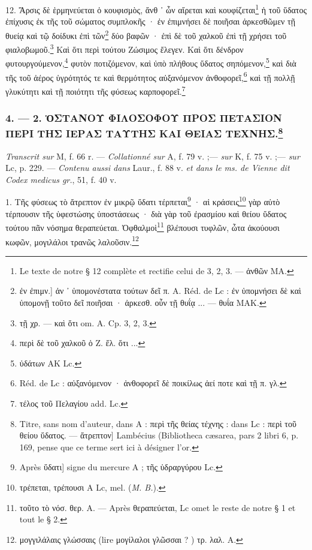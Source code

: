 \documentclass[a4paper, 11pt, oneside, polutonikogreek, french]{article}
\begin{document}
12. Ἄρσις δὲ ἑρμηνεύεται ὁ κουφισμὸς, ἄνθ ᾽ ὧν αἴρεται καὶ κουφίζεται\footnote{Le texte de notre § 12 complète et rectifie celui de 3, 2, 3. --- ἀνθῶν MA.} ἡ τοῦ ὕδατος ἐπίχυσις ἐκ τῆς τοῦ σώματος συμπλοκῆς · ἐν ἐπιμνήσει δὲ ποιῆσαι ἀρκεσθῶμεν τῇ θυείᾳ καὶ τῷ δοίδυκι ἐπὶ τῶν\footnote{ἐν ἐπιμν.] ἀν ᾽ ὑπομονέστατα τούτων δεῖ π. A. Réd. de Lc : ἐν ὑπομνήσει δὲ καὶ ὑπομονῇ τοῦτο δεῖ ποιῆσαι · ἀρκεσθ. οὖν τῇ θυΐᾳ ... --- θυΐα MAK.} δύο βαφῶν · ἐπὶ δὲ τοῦ χαλκοῦ ἐπὶ τῇ χρήσει τοῦ φιαλοβωμοῦ.\footnote{τῇ χρ. --- καὶ ὅτι om. A. Cp. 3, 2, 3.} Καὶ ὅτι περὶ τούτου Ζώσιμος ἔλεγεν. Καὶ ὅτι δένδρον φυτουργούμενον,\footnote{περὶ δὲ τοῦ χαλκοῦ ὁ Ζ. ἔλ. ὅτι ...} φυτὸν ποτιζόμενον, καὶ ὑπὸ πλήθους ὕδατος σηπόμενον,\footnote{ὐδάτων AK Lc.} καὶ διὰ τῆς τοῦ ἀέρος ὑγρότητός τε καὶ θερμότητος αὐξανόμενον ἀνθοφορεῖ,\footnote{Réd. de Lc : αὐξανόμενον · ἀνθοφορεῖ δὲ ποικίλως ἀεί ποτε καὶ τῇ π. γλ.} καὶ τῇ πολλῇ γλυκύτητι καὶ τῇ ποιότητι τῆς φύσεως καρποφορεῖ.\footnote{τέλος τοῦ Πελαγίου add. Lc.}

\bigskip
\centerline{\EightStarTaper}
\centerline{\EightStarTaper\EightStarTaper}
\bigskip

\subsubsection[4. --- 2. ὈΣΤΑΝΟΥ ΦΙΛΟΣΟΦΟΥ ΠΡΟΣ ΠΕΤΑΣΙΟΝ ΠΕΡΙ ΤΗΣ ΙΕΡΑΣ ΤΑΥΤΗΣ ΚΑΙ ΘΕΙΑΣ ΤΕΧΝΗΣ.]{4. --- 2. ὈΣΤΑΝΟΥ ΦΙΛΟΣΟΦΟΥ ΠΡΟΣ ΠΕΤΑΣΙΟΝ ΠΕΡΙ ΤΗΣ ΙΕΡΑΣ ΤΑΥΤΗΣ ΚΑΙ ΘΕΙΑΣ ΤΕΧΝΗΣ.\footnote{Titre, sans nom d'auteur, dans A : περὶ τῆς θείας τέχνης : dans Lc : περὶ τοῦ θείου ὕδατος. --- ἄτρεπτον] Lambécius (Bibliotheca cæsarea, pars 2 libri 6, p. 169, pense que ce terme sert ici à désigner l'or.}}

\emph{Transcrit sur} M, f. 66 r. --- \emph{Collationné sur} A, f. 79 v. ;--- \emph{sur} K, f. 75 v. ;--- \emph{sur} Lc, p. 229. --- \emph{Contenu aussi dans} Laur., f. 88 v. \emph{et dans le ms. de Vienne dit Codex medicus gr.}, 51, f. 40 v.

\bigskip

1. Τῆς φύσεως τὸ ἄτρεπτον ἐν μικρῷ ὕδατι τέρπεται\footnote{Après ὕδατι] signe du mercure A ; τῆς ὑδραργύρου Lc.} · αἱ κράσεις\footnote{τρέπεται, τρέπουσι A Lc, mel. (\emph{M. B.}).} γὰρ αὐτὸ τέρπουσιν τῆς ὑφεστώσης ὑποστάσεως · διὰ γὰρ τοῦ ἐρασμίου καὶ θείου ὕδατος τούτου πᾶν νόσημα θεραπεύεται. Ὀφθαλμοὶ\footnote{τοῦτο τὸ νόσ. θερ. A. --- Après θεραπεύεται, Lc omet le reste de notre § 1 et tout le § 2.} βλέπουσι τυφλῶν, ὦτα ἀκούουσι κωφῶν, μογιλάλοι τρανῶς λαλοῦσιν.\footnote{μογγιλάλαις γλώσσαις (lire μογίλαλοι γλῶσσαι ? ) τρ. λαλ. A.}
\end{document}
